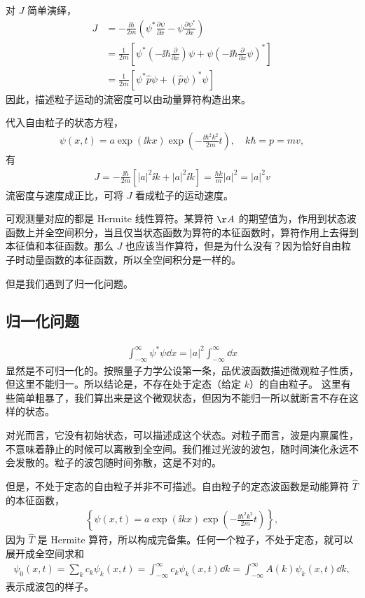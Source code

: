 对 $J$ 简单演绎，
\begin{align}
    J &= -\frac{\ii\hbar}{2m} \left( \psi^* \frac{\partial \psi}{\partial x} - \psi \frac{\partial \psi^*}{\partial x}\right) \\
    &= \frac{1}{2m} \left[
        \psi^* \left(-\ii\hbar\frac{\partial}{\partial x}\right) \psi +
        \psi \left(-\ii\hbar\frac{\partial}{\partial x} \psi\right) ^*
    \right] \\
    &= \frac1{2m} \left[\psi^* \hat p \psi + (\hat p\psi)^* \psi\right]
\end{align}
因此，描述粒子运动的流密度可以由动量算符构造出来。

代入自由粒子的状态方程，
\begin{eqnarray}
    \psi(x,t) = a \exp (\ii k x) \exp \left( - \frac{\ii\hbar^2k^2}{2m}t\right), \quad k\hbar = p = mv,
\end{eqnarray}
有
\begin{eqnarray}
    J = -\frac{\ii\hbar}{2m} [|a|^2 \ii k + |a|^2 \ii k] = \frac{\hbar k} m |a|^2 = |a|^2 v
\end{eqnarray}
流密度与速度成正比，可将 $J$ 看成粒子的运动速度。

可观测量对应的都是 Hermite 线性算符。某算符 $\AA$ 的期望值为，作用到状态波函数上并全空间积分，当且仅当状态函数为算符的本征函数时，算符作用上去得到本征值和本征函数。那么 $J$ 也应该当作算符，但是为什么没有？因为恰好自由粒子时动量函数的本征函数，所以全空间积分是一样的。

但是我们遇到了归一化问题。

\subsection{归一化问题}
\begin{eqnarray}
    \int_{-\infty}^\infty \psi^*\psi \dd x = |a|^2 \int_{-\infty}^\infty \dd x
\end{eqnarray}
显然是不可归一化的。按照量子力学公设第一条，品优波函数描述微观粒子性质，但这里不能归一。所以结论是，不存在处于定态（给定 $k$）的自由粒子。
这里有些简单粗暴了，我们算出来是这个微观状态，但因为不能归一所以就断言不存在这样的状态。

对光而言，它没有初始状态，可以描述成这个状态。对粒子而言，波是内禀属性，不意味着静止的时候可以离散到全空间。我们推过光波的波包，随时间演化永远不会发散的。粒子的波包随时间弥散，这是不对的。

但是，不处于定态的自由粒子并非不可描述。自由粒子的定态波函数是动能算符 $\hat T$ 的本征函数，
\begin{eqnarray}
    \left\{\psi(x,t) = a \exp (\ii k x) \exp \left( - \frac{\ii\hbar^2k^2}{2m}t\right)
    \right\},
\end{eqnarray}
因为 $\hat T$ 是 Hermite 算符，所以构成完备集。任何一个粒子，不处于定态，就可以展开成全空间求和
\begin{eqnarray}
    \psi_0 (x,t) = \sum_k c_k\psi_k(x,t) = \int_{-\infty}^\infty c_k\psi_k (x,t) \dd k = \int_{-\infty}^\infty A(k) \psi_k(x,t) \dd k, \label{eq:wave_expand_fullSet}
\end{eqnarray}
表示成波包的样子。

